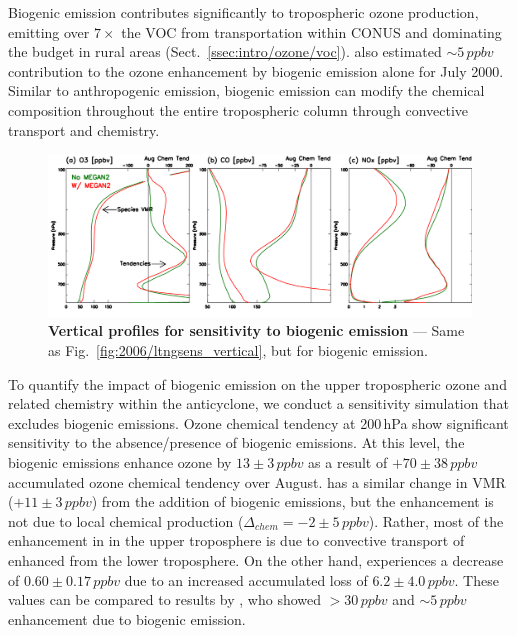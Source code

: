 Biogenic emission contributes significantly to tropospheric ozone production, emitting over $7\times$ the VOC from
transportation within CONUS and dominating the budget in rural areas (Sect.~\ref{ssec:intro/ozone/voc}). \citet{Li:2005ss}
also estimated $\sim5\,\unit{ppbv}$ contribution to the ozone enhancement by biogenic emission alone for July 2000.
Similar to anthropogenic emission, biogenic emission can modify the chemical composition throughout the entire tropospheric
column through convective transport and chemistry.

	\begin{figure}[t!]
		\centering
		\includegraphics[width=1.0\textwidth]{sens/biosens_vert}
		\caption[Vertical profiles for sensitivity to biogenic emission]{\textbf{Vertical profiles for sensitivity to
		biogenic emission} --- Same as Fig.~\ref{fig:2006/ltngsens_vertical}, but for biogenic emission.
		\label{fig:2006/biosens_vert} }\vspace{-.3in}
	\end{figure}

To quantify the impact of biogenic emission on the upper tropospheric ozone and related chemistry within the anticyclone,
we conduct a sensitivity simulation that excludes biogenic emissions. Ozone chemical tendency at 200\,\unit{hPa}
show significant sensitivity to the absence/presence of biogenic emissions. At this level, the
biogenic emissions enhance ozone by $13\pm3\,\unit{ppbv}$ as a result of $+70\pm38\,\unit{ppbv}$ accumulated
ozone chemical tendency over August.  has a similar change in VMR ($+11\pm3\,\unit{ppbv}$) from the
addition of biogenic emissions, but the enhancement is not due to local chemical production ($\Delta_{chem}=-2\pm5\,\unit{ppbv}$).
Rather, most of the enhancement in  in the upper troposphere is due to convective transport of enhanced 
from the lower troposphere. On the other
hand,  experiences a decrease of $0.60\pm0.17\,\unit{ppbv}$ due to an increased accumulated loss of
$6.2\pm4.0\,\unit{ppbv}$. These values can be compared to results by \citet{Li:2005ss}, who showed $>30\,\unit{ppbv}$
 and $\sim5\,\unit{ppbv}$  enhancement due to biogenic emission.

